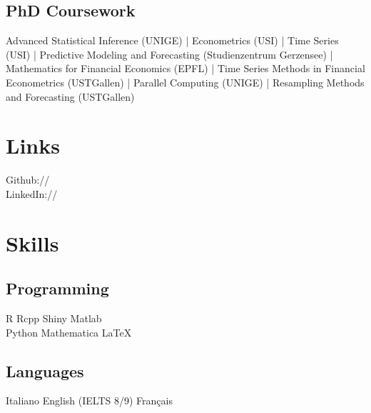 \documentclass[]{deedy-resume-openfont}
\begin{document}
\begin{minipage}[t]{0.33\textwidth}
\subsection{PhD Coursework}
Advanced Statistical Inference (UNIGE) |
Econometrics (USI) |
Time Series (USI) |
Predictive Modeling and Forecasting (Studienzentrum Gerzensee) |
Mathematics for Financial Economics (EPFL) |
Time Series Methods in Financial Econometrics (USTGallen) |
Parallel Computing (UNIGE) |
Resampling Methods and Forecasting (USTGallen)
\sectionsep


\section{Links}
Github:// \href{https://github.com/quainialberto}{} \\
LinkedIn:// \href{https://www.linkedin.com/in/alberto-quaini-18b709a9/}{} \\
\sectionsep



\section{Skills}
\subsection{Programming}
R \textbullet{} Rcpp \textbullet{} Shiny \textbullet{} Matlab \\
Python \textbullet{} Mathematica \textbullet{} \LaTeX\ \\ 
\sectionsep

\subsection{Languages}
Italiano \textbullet{} English (IELTS 8/9)\textbullet{} Français

%
%

\end{minipage} 
\hfill
\end{document}
